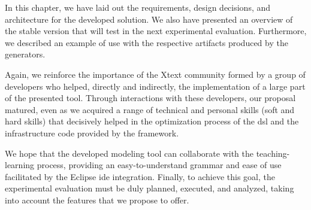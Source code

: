 In this chapter, we have laid out the requirements, design decisions, and architecture for the developed solution.
We also have presented an overview of the stable version that will test in the next experimental evaluation. 
Furthermore, we described an example of use with the respective artifacts produced by the generators.

Again, we reinforce the importance of the Xtext community formed by a group of developers who helped, directly and indirectly, the implementation of a large part of the presented tool.
Through interactions with these developers, our proposal matured,  even as we acquired a range of technical and personal skills (soft and hard skills) that decisively helped in the optimization process of the \ac{dsl} and the infrastructure code provided by the framework.

We hope that the developed modeling tool can collaborate with the teaching-learning process, providing an easy-to-understand grammar and ease of use facilitated by the Eclipse \ac{ide} integration.
Finally, to achieve this goal, the experimental evaluation must be duly planned, executed, and analyzed, taking into account the features that we propose to offer.


